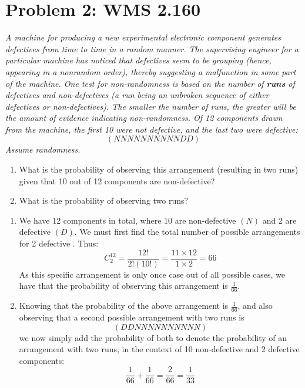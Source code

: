 \documentclass{article}
\begin{document}
\pagebreak

\section*{Problem 2: WMS 2.160}
	\emph{A machine for producing a new experimental electronic component generates defectives from time to time in a random manner. The supervising engineer for a particular machine has noticed that defectives seem to be grouping (hence, appearing in a nonrandom order), thereby suggesting a malfunction in some part of the machine. One test for non-randomness is based on the number of \textbf{runs} of defectives and non-defectives (a run being an unbroken sequence of either defectives or non-defectives). The smaller the number of runs, the greater will be the amount of evidence indicating non-randomness. Of 12 components drawn from the machine, the first 10 were not defective, and the last two were defective: 
	$$ (NNNNNNNNNNDD)$$  Assume randomness.}
	\begin{enumerate}
		\item What is the probability of observing this arrangement (resulting in two runs) given that 10 out of 12 components are non-defective?
		\item What is the probability of observing two runs? 
	\end{enumerate}
	\begin{sol}
		\begin{enumerate}
			\item We have 12 components in total, where 10 are non-defective $(N)$ and 2 are defective $(D)$. We must first find the total number of possible arrangements for 2 defective . Thus:
			$$ C_2^{12} = \frac{12!}{2!(10!)} = \frac{11\times12}{1\times2} = 66$$
			As this specific arrangement is only once case  out of all possible cases, we have that the probability of observing this arrangement is $\frac{1}{66}$. 
			
			\item Knowing that the probability of the above arrangement is $\frac{1}{66}$, and also observing that a second possible arrangement with two runs is
			$$ (DDNNNNNNNNNN)$$
			we now simply add the probability of both to denote the probability of an arrangement with two runs, in the context of 10 non-defective and 2 defective components:
			$$ \frac{1}{66} + \frac{1}{66} = \frac{2}{66} = \frac{1}{33}$$
		\end{enumerate}
	\end{sol}
	
\end{document}
